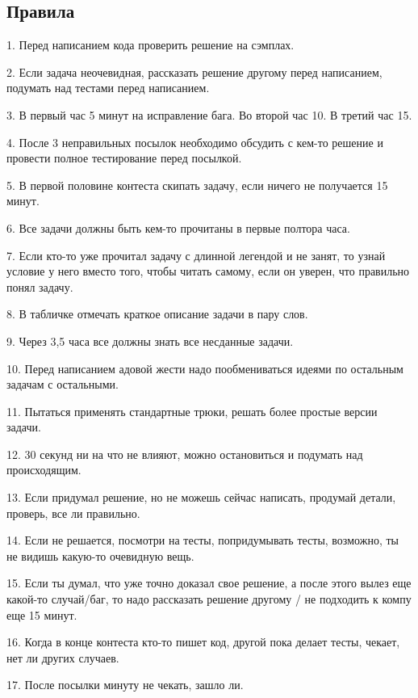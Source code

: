 \documentclass[10pt, portrait,letterpaper]{article}
\begin{document}
\newpage

\subsection{Правила}

1. Перед написанием кода проверить решение на сэмплах.

2. Если задача неочевидная, рассказать решение другому перед написанием, подумать над тестами перед написанием.

3. В первый час 5 минут на исправление бага. Во второй час 10. В третий час 15.

4. После 3 неправильных посылок необходимо обсудить с кем-то решение и провести полное тестирование перед посылкой.

5. В первой половине контеста скипать задачу, если ничего не получается 15 минут.

6. Все задачи должны быть кем-то прочитаны в первые полтора часа.

7. Если кто-то уже прочитал задачу с длинной легендой и не занят, то узнай условие у него вместо того, чтобы читать самому, если он уверен, что правильно понял задачу.

8. В табличке отмечать краткое описание задачи в пару слов.

9. Через 3,5 часа все должны знать все несданные задачи.

10. Перед написанием адовой жести надо пообмениваться идеями по остальным задачам с остальными.

11. Пытаться применять стандартные трюки, решать более простые версии задачи.

12. 30 секунд ни на что не влияют, можно остановиться и подумать над происходящим.

13. Если придумал решение, но не можешь сейчас написать, продумай детали, проверь, все ли правильно.

14. Если не решается, посмотри на тесты, попридумывать тесты, возможно, ты не видишь какую-то очевидную вещь.

15. Если ты думал, что уже точно доказал свое решение, а после этого вылез еще какой-то случай/баг, то надо рассказать решение другому / не подходить к компу еще 15 минут.

16. Когда в конце контеста кто-то пишет код, другой пока делает тесты, чекает, нет ли других случаев.

17. После посылки минуту не чекать, зашло ли.

\newpage
\end{document}
